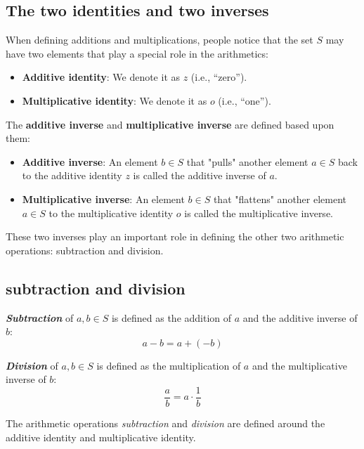 \documentclass[12pt, letterpaper, oneside]{book}
\begin{document}
\subsection{The two identities and two inverses}

When defining additions and multiplications, people notice that the set $S$ may
have two elements that play a special role in the arithmetics:

\begin{itemize}
  \item \textbf{Additive identity}: We denote it as $z$ (i.e., ``zero'').
  \item \textbf{Multiplicative identity}: We denote it as $o$ (i.e., ``one'').
\end{itemize}

The \textbf{additive inverse} and \textbf{multiplicative inverse} are defined
based upon them:

\begin{itemize}
  \item \textbf{Additive inverse}: An element $b \in S$ that "pulls" another
    element $a \in S$ back to the additive identity $z$ is called the additive
    inverse of $a$.
  \item \textbf{Multiplicative inverse}: An element $b \in S$ that "flattens"
    another element $a \in S$ to the multiplicative identity $o$ is called the
    multiplicative inverse.
\end{itemize}

These two inverses play an important role in defining the other two arithmetic
operations: subtraction and division.

\subsection{subtraction and division}

\textbf{\textit{Subtraction}} of $a, b \in S$ is defined as the addition of $a$
and the additive inverse of $b$:
\[ a - b = a + (-b)\]

\textbf{\textit{Division}} of $a, b \in S$ is defined as the multiplication of
$a$ and the multiplicative inverse of $b$:
\[ \frac{a}{b} = a \cdot \frac{1}{b} \]

The arithmetic operations \textit{subtraction} and \textit{division} are
defined around the additive identity and multiplicative identity.
\end{document}

